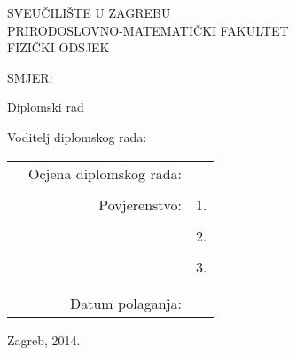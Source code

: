 \begin{titlepage}
\begin{center}
\linespread{1}
{\Large SVEUČILIŠTE U ZAGREBU}\\
{\Large PRIRODOSLOVNO-MATEMATIČKI FAKULTET}\\
{\Large FIZIČKI ODSJEK} 

\vspace{0.8cm}

{\Large SMJER: \SMJER} 

\vspace{1.3cm}

{\LARGE \textbf{\ImeIPrezime}} 

\vspace{1cm}

{\large Diplomski rad\par} 

\vfill

{\Large \NASLOV\par}

\vfill

{\large Voditelj diplomskog rada: \VODITELJ}

\vspace{1.3cm}

{\large
\begin{tabular}{crr}
\hspace{0cm} & Ocjena diplomskog rada: \hspace{5mm} &  \underline{\hspace{5cm}} \\ 
 &  &  \\ 
 & Povjerenstvo: \hspace{5mm} & 1. \underline{\hspace{5cm}} \\ 
 &  &  \\  
 &  & 2. \underline{\hspace{5cm}} \\ 
 &  &  \\  
 &  & 3. \underline{\hspace{5cm}} \\ 
 &  &  \\  
 &  &  \\  
 & Datum polaganja: \hspace{5mm} & \underline{\hspace{5cm}} \\ 
 
\end{tabular} 
} %

\vspace{1.5cm}

{\large Zagreb, 2014.}

\end{center}
\end{titlepage}
